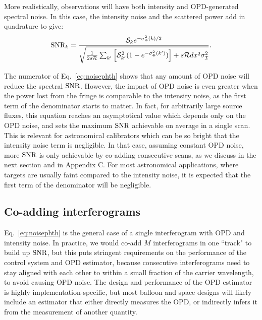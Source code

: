 
More realistically, observations will have
both intensity and OPD-generated spectral noise. In this case, the intensity noise and the scattered power
add in quadrature to give:
\begin{equation}
\textrm{SNR}_k = \frac{\mathcal{S}_k e^{-\sigma^2_\Phi(k)/2}}{\sqrt{\frac{1}{2s\mathcal{R}}\sum_{k'} \left[\mathcal{S}_{k'}^2(1-e^{-\sigma^2_\Phi(k')})\right] + s\mathcal{R}dx^2\sigma_{\mathcal{I}}^2}}.
\label{eq:noisephth}
\end{equation}

The numerator of Eq.~\ref{eq:noisephth} shows that any amount of OPD noise will reduce the spectral $\textrm{SNR}$. However, the impact of OPD noise is even greater when the power lost from the fringe is comparable to the intensity noise, as the first term of the denominator starts to matter. In fact, for arbitrarily large source fluxes, this equation reaches an asymptotical value which depends only on the OPD noise, and sets the maximum $\textrm{SNR}$ achievable on average in a single scan. This is relevant for astronomical calibrators which can be so bright that the intensity noise term is negligible. In that case, assuming constant OPD noise, more $\textrm{SNR}$ is only achievable by co-adding consecutive scans, as we discuss in the next section and in Appendix C. For most astronomical applications, where targets are usually faint compared to the intensity noise, it is expected that the first term of the denominator will be negligible.



\subsection{Co-adding interferograms}

Eq.~\ref{eq:noisephth} is the general case of a single interferogram with OPD and intensity noise. In practice, we would co-add $M$ interferograms in one ``track" to build up $\textrm{SNR}$, but this puts stringent requirements on the performance of the control system and OPD estimator, because consecutive interferograms need to stay aligned with each other to within a small fraction of the carrier wavelength, to avoid causing OPD noise. The design and performance of the OPD estimator is highly implementation-specific, but most balloon and space designs will likely include an estimator that either directly measures the OPD, or indirectly infers it from the measurement of another quantity. 

